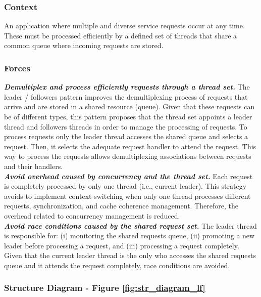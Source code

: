 \subsubsection{Context}

An application where multiple and diverse service requests occur at any time. These must be processed efficiently by a defined set of threads that share a common queue where incoming requests are stored.

\subsubsection{Forces}

\noindent \textbf{\textit{Demultiplex and process efficiently requests through a thread set.}}\textit{ }The leader / followers pattern improves the demultiplexing process of requests that arrive and are stored in a shared resource (queue). Given that these requests can be of different types, this pattern proposes that the thread set appoints a leader thread and followers threads in order to manage the processing of requests. To process requests only the leader thread accesses the shared queue and selects a request. Then, it selects the adequate request handler to attend the request. This way to process the requests allows demultiplexing associations between requests and their handlers.\\

\noindent \textbf{\textit{Avoid overhead caused by concurrency and the thread set.}}\textit{ }Each request is completely processed by only one thread (i.e., current leader). This strategy avoids to implement context switching when only one thread processes different requests, synchronization, and cache coherence management. Therefore, the overhead related to concurrency management is reduced.\\

\noindent \textbf{\textit{Avoid race conditions caused by the shared request set.}}\textit{ }The leader thread is responsible for: (i) monitoring the shared requests queue, (ii) promoting a new leader before processing a request, and (iii) processing a request completely. Given that the current leader thread is the only who accesses the shared requests queue and it attends the request completely, race conditions are avoided.

\subsubsection{Structure Diagram - Figure \ref{fig:str_diagram_lf}}

